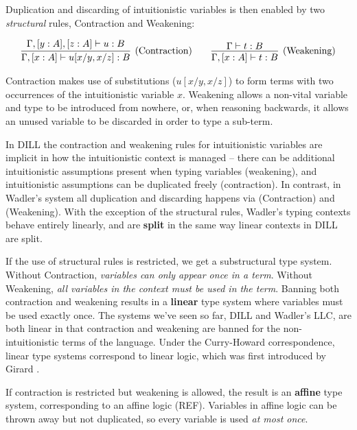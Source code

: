 \documentclass[]{unswthesis}
\newcommand{\types}{\vdash}
\let\i\textit
\let\b\textbf
\let\t\text
\begin{document}
Duplication and discarding of intuitionistic variables is then enabled by two \i{structural} rules, Contraction and Weakening:

\begin{eqnarray*}
\infer[\t{(Contraction)}]{\Gamma, [x : A] \types u[x/y, x/z] : B}{
  \Gamma, [y : A], [z : A] \types u : B
}
\qquad
\infer[\text{(Weakening)}]{\Gamma, [x : A] \types t : B}{
  \Gamma \types t : B
}
\end{eqnarray*}

Contraction makes use of substitutions ($u[x/y, x/z]$) to form terms with two occurrences of the intuitionistic variable $x$. Weakening allows a non-vital variable and type to be introduced from nowhere, or, when reasoning backwards, it allows an unused variable to be discarded in order to type a sub-term.

In DILL the contraction and weakening rules for intuitionistic variables are implicit in how the intuitionistic context is managed -- there can be additional intuitionistic assumptions present when typing variables (weakening), and intuitionistic assumptions can be duplicated freely (contraction). In contrast, in Wadler's system all duplication and discarding happens via (Contraction) and (Weakening). With the exception of the structural rules, Wadler's typing contexts behave entirely linearly, and are \b{split} in the same way linear contexts in DILL are split.

If the use of structural rules is restricted, we get a substructural type system. Without Contraction, \i{variables can only appear once in a term}. Without Weakening, \i{all variables in the context must be used in the term}. Banning both contraction and weakening results in a \b{linear} type system where variables must be used exactly once. The systems we've seen so far, DILL and Wadler's LLC, are both linear in that contraction and weakening are banned for the non-intuitionistic terms of the language. Under the Curry-Howard correspondence, linear type systems correspond to linear logic, which was first introduced by Girard \cite{girard87}.

If contraction is restricted but weakening is allowed, the result is an \b{affine} type system, corresponding to an affine logic (REF). Variables in affine logic can be thrown away but not duplicated, so every variable is used \i{at most once}.

\end{document}
